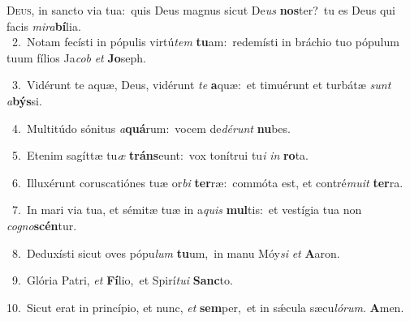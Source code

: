 \lettrine{\initial\textcolor{\initialcolor}{D}}{eus,} in sancto via tua:~\dagger quis Deus magnus sicut De\textit{us} \textbf{nos}\-ter?~\star tu es Deus qui facis \textit{mi}\-\textit{ra}\textbf{bí}lia.\\
{\numbfont\textcolor{\numbcolor}{~2.}}~Notam fecísti in pópulis virtú\textit{tem} \textbf{tu}\-am:~\star redemísti in bráchio tuo pópulum tuum fílios Ja\textit{cob} \textit{et} \textbf{Jo}\-seph.\par
{\numbfont\textcolor{\numbcolor}{~3.}}~Vidérunt te aquæ, Deus, vidérunt \textit{te} \textbf{a}\-quæ:~\star et timuérunt et turbátæ \textit{sunt} \textit{a}\-\textbf{býs}si.\par
{\numbfont\textcolor{\numbcolor}{~4.}}~Multitúdo sónitus \textit{a}\-\textbf{quá}rum:~\star vocem de\-\textit{dé}\-\textit{runt} \textbf{nu}\-bes.\par
{\numbfont\textcolor{\numbcolor}{~5.}}~Etenim sagíttæ tu\textit{æ} \textbf{tráns}\-eunt:~\star vox tonítrui tu\textit{i} \textit{in} \textbf{ro}\-ta.\par
{\numbfont\textcolor{\numbcolor}{~6.}}~Illuxérunt coruscatiónes tuæ or\textit{bi} \textbf{ter}\-ræ:~\star commóta est, et contré\-\textit{mu}\-\textit{it} \textbf{ter}\-ra.\par
{\numbfont\textcolor{\numbcolor}{~7.}}~In mari via tua, et sémitæ tuæ in a\textit{quis} \textbf{mul}\-tis:~\star et vestígia tua non \textit{co}\-\textit{gno}\textbf{scén}tur.\par
{\numbfont\textcolor{\numbcolor}{~8.}}~Deduxísti sicut oves pópu\textit{lum} \textbf{tu}\-um,~\star in manu Móy\textit{si} \textit{et} \textbf{A}\-aron.\par
{\numbfont\textcolor{\numbcolor}{~9.}}~Glória Patri, \textit{et} \textbf{Fí}\-lio,~\star et Spirí\-\textit{tu}\-\textit{i} \textbf{Sanc}\-to.\par
{\numbfont\textcolor{\numbcolor}{10.}}~Sicut erat in princípio, et nunc, \textit{et} \textbf{sem}\-per,~\star et in sǽcula sæcu\-\textit{ló}\-\textit{rum}. \textbf{A}\-men.\par
